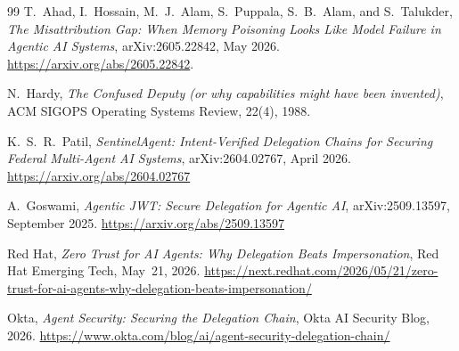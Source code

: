 \documentclass[11pt]{article}
\begin{document}
\begin{thebibliography}{99}
 T.~Ahad, I.~Hossain, M.~J.~Alam, S.~Puppala,
S.~B.~Alam, and S.~Talukder, \emph{The Misattribution Gap: When Memory Poisoning
Looks Like Model Failure in Agentic AI Systems}, arXiv:2605.22842, May 2026.
\url{https://arxiv.org/abs/2605.22842}.

 N.~Hardy, \emph{The Confused Deputy (or why capabilities might
have been invented)}, ACM SIGOPS Operating Systems Review, 22(4), 1988.

 K.~S.~R.~Patil, \emph{SentinelAgent: Intent-Verified Delegation Chains for
Securing Federal Multi-Agent AI Systems}, arXiv:2604.02767, April 2026.
\url{https://arxiv.org/abs/2604.02767}

 A.~Goswami, \emph{Agentic JWT: Secure Delegation for Agentic AI},
arXiv:2509.13597, September 2025. \url{https://arxiv.org/abs/2509.13597}

 Red Hat, \emph{Zero Trust for AI Agents: Why Delegation Beats Impersonation},
Red Hat Emerging Tech, May~21, 2026.
\url{https://next.redhat.com/2026/05/21/zero-trust-for-ai-agents-why-delegation-beats-impersonation/}

 Okta, \emph{Agent Security: Securing the Delegation Chain}, Okta AI Security Blog, 2026.
\url{https://www.okta.com/blog/ai/agent-security-delegation-chain/}

\end{thebibliography}
\end{document}
